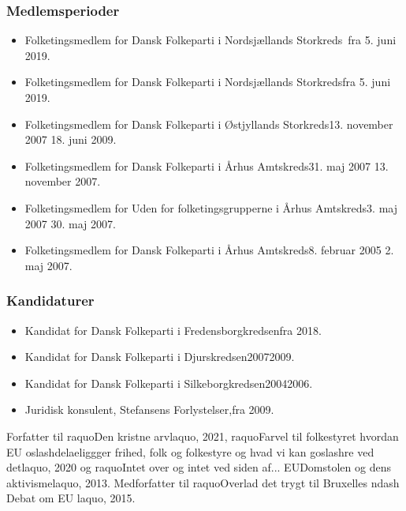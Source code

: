 \documentclass[11pt, a4paper]{awesome-cv}
\begin{document}
\begin{cvletter}
\subsubsection*{Medlemsperioder}
\begin{itemize}
\item Folketingsmedlem for Dansk Folkeparti i Nordsjællands Storkreds fra 5. juni 2019.
\item Folketingsmedlem for Dansk Folkeparti i Nordsjællands Storkredsfra 5. juni 2019.
\item Folketingsmedlem for Dansk Folkeparti i Østjyllands Storkreds13. november 2007  18. juni 2009.
\item Folketingsmedlem for Dansk Folkeparti i Århus Amtskreds31. maj 2007  13. november 2007.
\item Folketingsmedlem for Uden for folketingsgrupperne i Århus Amtskreds3. maj 2007  30. maj 2007.
\item Folketingsmedlem for Dansk Folkeparti i Århus Amtskreds8. februar 2005  2. maj 2007.
\end{itemize}
\subsubsection*{Kandidaturer}
\begin{itemize}
\item Kandidat for Dansk Folkeparti i Fredensborgkredsenfra 2018.
\item Kandidat for Dansk Folkeparti i Djurskredsen20072009.
\item Kandidat for Dansk Folkeparti i Silkeborgkredsen20042006.
\end{itemize}
\begin{itemize}
\item Juridisk konsulent, Stefansens Forlystelser,fra 2009.
\end{itemize}
Forfatter til raquoDen kristne arvlaquo, 2021, raquoFarvel til folkestyret hvordan EU oslashdelaeliggger frihed, folk og folkestyre  og hvad vi kan goslashre ved detlaquo, 2020 og raquoIntet over og intet ved siden af... EUDomstolen og dens aktivismelaquo, 2013. Medforfatter til raquoOverlad det trygt til Bruxelles ndash Debat om EU laquo, 2015.

\end{cvletter}
\end{document}
